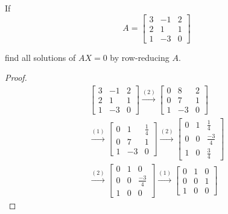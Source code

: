 \begin{exercise}
    If
    \[
        A =
        \begin{bmatrix}
            3 & -1 & 2 \\
            2 & 1  & 1 \\
            1 & -3 & 0
        \end{bmatrix}
    \]

    find all solutions of $AX = 0$ by row-reducing $A$.
\end{exercise}

\begin{proof}
    \begingroup{}
    \allowdisplaybreaks{}
    \begin{multline*}
        \begin{bmatrix}
            3 & -1 & 2 \\
            2 & 1  & 1 \\
            1 & -3 & 0
        \end{bmatrix}
        \stackrel{(2)}{\rightarrow}
        \begin{bmatrix}
            0 & 8  & 2 \\
            0 & 7  & 1 \\
            1 & -3 & 0
        \end{bmatrix} \\
        \stackrel{(1)}{\rightarrow}
        \begin{bmatrix}
            0 & 1  & \frac{1}{4} \\
            0 & 7  & 1           \\
            1 & -3 & 0
        \end{bmatrix}
        \stackrel{(2)}{\rightarrow}
        \begin{bmatrix}
            0 & 1 & \frac{1}{4}  \\
            0 & 0 & \frac{-3}{4} \\
            1 & 0 & \frac{3}{4}
        \end{bmatrix} \\
        \stackrel{(2)}{\rightarrow}
        \begin{bmatrix}
            0 & 1 & 0            \\
            0 & 0 & \frac{-3}{4} \\
            1 & 0 & 0
        \end{bmatrix}
        \stackrel{(1)}{\rightarrow}
        \begin{bmatrix}
            0 & 1 & 0 \\
            0 & 0 & 1 \\
            1 & 0 & 0
        \end{bmatrix}
    \end{multline*}
    \endgroup{}


\end{proof}
